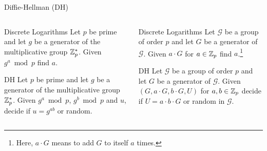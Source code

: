 \documentclass[xcolor=table,10pt,aspectratio=169]{beamer}
\begin{document}
\begin{frame}[label={sec:orgd159c0a}]{Diffie-Hellman (DH)}
\begin{columns}[t]
\begin{column}{0.5\columnwidth}
\begin{block}{Discrete Logarithms}
Let \(p\) be prime and let \(g\) be a generator of the multiplicative group \(\mathbb{Z}_{p}^{*}\). Given \(g^{a} \bmod p\) find \(a\).
\end{block}
\begin{block}{DH}
Let \(p\) be prime and let \(g\) be a generator of the multiplicative group \(\mathbb{Z}_{p}^{*}\). Given \(g^{a} \bmod p\), \(g^{b} \bmod p\) and \(u\), decide if \(u = g^{ab}\) or random.
\end{block}
\end{column}
\begin{column}{0.5\columnwidth}
\begin{block}{Discrete Logarithms}
Let \(\mathcal{G}\) be a group of order \(p\) and let \(G\) be a generator of \(\mathcal{G}\). Given \({a}\cdot G\) for \(a \in \mathbb{Z}_{p}\) find \(a\).\footnote{Here, \(a \cdot G\) means to add \(G\) to itself \(a\) times.}
\end{block}
\begin{block}{DH}
Let \(\mathcal{G}\) be a group of order \(p\) and let \(G\) be a generator of \(\mathcal{G}\). Given \((G, {a} \cdot G, {b} \cdot G, U)\) for \(a,b \in \mathbb{Z}_{p}\) decide if \(U = a\cdot b \cdot G\) or random in \(\mathcal{G}\).
\end{block}
\end{column}
\end{columns}
\end{frame}
\end{document}
